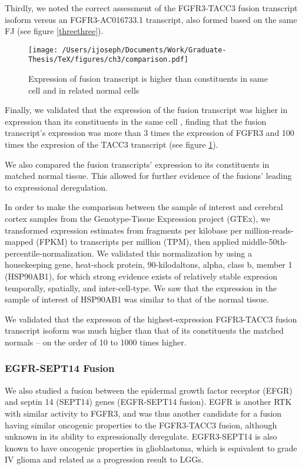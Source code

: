 Thirdly, we noted the correct assessment of the FGFR3-TACC3 fusion transcript isoform versus an FGFR3-AC016733.1 transcript, also formed based on the same FJ (see figure \ref{threethree}).


\begin{figure}
  \centering \texttt{[image: /Users/ijoseph/Documents/Work/Graduate-Thesis/TeX/figures/ch3/comparison.pdf]}
  \caption{Expression of fusion transcript is higher than constituents in same cell and in related normal cells}\label{threefour}
\end{figure}


Finally, we validated that the expression of the fusion transcript was higher in expression than its constituents in the same cell , finding that the fusion transcript's expression was more than 3 times the expression of FGFR3 and 100 times the expresion of the TACC3 transcript (see figure \ref{threefour}).

We also compared the fusion transcripts' expression to its constituents in matched normal tissue. This allowed for further evidence of the fusions' leading to expressional deregulation.

In order to make the comparison between the sample of interest and cerebral cortex samples from the Genotype-Tissue Expression project (GTEx)\cite{lonsdale_genotype-tissue_2013}, we transformed expression estimates from fragments per kilobase per million-reads-mapped (FPKM) to transcripts per million (TPM), then applied middle-50th-percentile-normalization\cite{_what_2014}. We validated this normalization by using a housekeeping gene, heat-shock protein, 90-kilodaltons, alpha, class b, member 1 (HSP90AB1), for which strong evidence exists of relatively stable expresion temporally, spatially, and inter-cell-type. We saw that the expression in the sample of interest of HSP90AB1 was similar to that of the normal tissue.

We validated that the expresson of the highest-expression FGFR3-TACC3 fusion transcript isoform was much higher than that of its constituents the matched normals -- on the order of 10 to 1000 times higher.

\subsubsection{EGFR-SEPT14 Fusion}

We also studied a fusion between the epidermal growth factor receptor (EFGR) and septin 14 (SEPT14) genes (EGFR-SEPT14 fusion). EGFR is another RTK with similar activity to FGFR3, and was thus another candidate for a fusion having similar oncogenic properties to the FGFR3-TACC3 fusion, although unknown in its ability to expressionally deregulate. EGFR3-SEPT14 is also known to have oncogenic properties in glioblastoma, which is equivalent to grade IV glioma and related as a progression result to LGGs\cite{_omim_2016-1}. 

